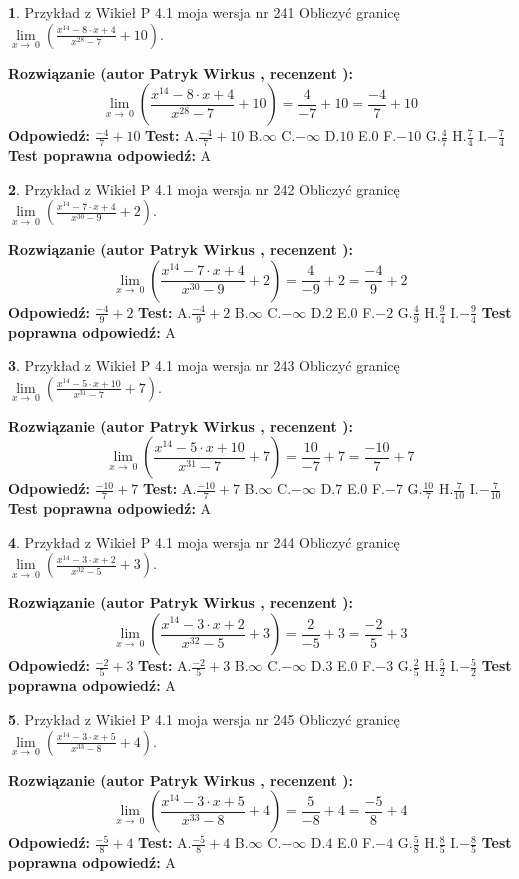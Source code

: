 \documentclass[12pt, a4paper]{article}
\theoremstyle{definition} %
\newtheorem{zad}{}
\newcommand{\zadStart}[1]{\begin{zad}#1\newline}
\newcommand{\zadStop}{\end{zad}}
\newcommand{\rozwStart}[2]{\noindent \textbf{Rozwiązanie (autor #1 , recenzent #2): }\newline}
\newcommand{\rozwStop}{\newline}
\newcommand{\odpStart}{\noindent \textbf{Odpowiedź:}\newline}
\newcommand{\odpStop}{\newline}
\newcommand{\testStart}{\noindent \textbf{Test:}\newline}
\newcommand{\testStop}{\newline}
\newcommand{\kluczStart}{\noindent \textbf{Test poprawna odpowiedź:}\newline}
\newcommand{\kluczStop}{\newline}
\begin{document}
\zadStart{Przykład z Wikieł P 4.1 moja wersja nr 241}
Obliczyć granicę $\lim\limits_{x\to\ 0}(\frac{x^{14}-8 \cdot x +4}{x^{28}-7}+10)$.
\zadStop
\rozwStart{Patryk Wirkus}{}
$$\lim\limits_{x\to\ 0}(\frac{x^{14}-8 \cdot x +4}{x^{28}-7}+10)=\frac{4}{-7}+10=\frac{-4}{7}+10$$
\rozwStop
\odpStart
$\frac{-4}{7}+10$
\odpStop
\testStart
A.$\frac{-4}{7}+10$
B.$\infty$
C.$-\infty$
D.$10$
E.$0$
F.$-10$
G.$\frac{4}{7}$
H.$\frac{7}{4}$
I.$-\frac{7}{4}$
\testStop
\kluczStart
A
\kluczStop



\zadStart{Przykład z Wikieł P 4.1 moja wersja nr 242}
Obliczyć granicę $\lim\limits_{x\to\ 0}(\frac{x^{14}-7 \cdot x +4}{x^{30}-9}+2)$.
\zadStop
\rozwStart{Patryk Wirkus}{}
$$\lim\limits_{x\to\ 0}(\frac{x^{14}-7 \cdot x +4}{x^{30}-9}+2)=\frac{4}{-9}+2=\frac{-4}{9}+2$$
\rozwStop
\odpStart
$\frac{-4}{9}+2$
\odpStop
\testStart
A.$\frac{-4}{9}+2$
B.$\infty$
C.$-\infty$
D.$2$
E.$0$
F.$-2$
G.$\frac{4}{9}$
H.$\frac{9}{4}$
I.$-\frac{9}{4}$
\testStop
\kluczStart
A
\kluczStop



\zadStart{Przykład z Wikieł P 4.1 moja wersja nr 243}
Obliczyć granicę $\lim\limits_{x\to\ 0}(\frac{x^{14}-5 \cdot x +10}{x^{31}-7}+7)$.
\zadStop
\rozwStart{Patryk Wirkus}{}
$$\lim\limits_{x\to\ 0}(\frac{x^{14}-5 \cdot x +10}{x^{31}-7}+7)=\frac{10}{-7}+7=\frac{-10}{7}+7$$
\rozwStop
\odpStart
$\frac{-10}{7}+7$
\odpStop
\testStart
A.$\frac{-10}{7}+7$
B.$\infty$
C.$-\infty$
D.$7$
E.$0$
F.$-7$
G.$\frac{10}{7}$
H.$\frac{7}{10}$
I.$-\frac{7}{10}$
\testStop
\kluczStart
A
\kluczStop



\zadStart{Przykład z Wikieł P 4.1 moja wersja nr 244}
Obliczyć granicę $\lim\limits_{x\to\ 0}(\frac{x^{14}-3 \cdot x +2}{x^{32}-5}+3)$.
\zadStop
\rozwStart{Patryk Wirkus}{}
$$\lim\limits_{x\to\ 0}(\frac{x^{14}-3 \cdot x +2}{x^{32}-5}+3)=\frac{2}{-5}+3=\frac{-2}{5}+3$$
\rozwStop
\odpStart
$\frac{-2}{5}+3$
\odpStop
\testStart
A.$\frac{-2}{5}+3$
B.$\infty$
C.$-\infty$
D.$3$
E.$0$
F.$-3$
G.$\frac{2}{5}$
H.$\frac{5}{2}$
I.$-\frac{5}{2}$
\testStop
\kluczStart
A
\kluczStop



\zadStart{Przykład z Wikieł P 4.1 moja wersja nr 245}
Obliczyć granicę $\lim\limits_{x\to\ 0}(\frac{x^{14}-3 \cdot x +5}{x^{33}-8}+4)$.
\zadStop
\rozwStart{Patryk Wirkus}{}
$$\lim\limits_{x\to\ 0}(\frac{x^{14}-3 \cdot x +5}{x^{33}-8}+4)=\frac{5}{-8}+4=\frac{-5}{8}+4$$
\rozwStop
\odpStart
$\frac{-5}{8}+4$
\odpStop
\testStart
A.$\frac{-5}{8}+4$
B.$\infty$
C.$-\infty$
D.$4$
E.$0$
F.$-4$
G.$\frac{5}{8}$
H.$\frac{8}{5}$
I.$-\frac{8}{5}$
\testStop
\kluczStart
A
\kluczStop
\end{document}
